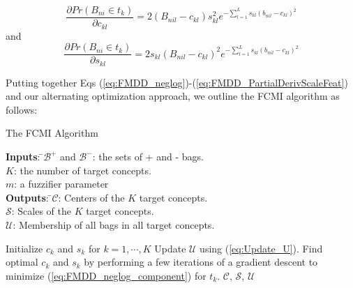 \documentclass[12pt,dvips]{report}
\numberwithin{equation}{section}
\begin{document}
\begin{equation}  \label{eq:FMDD_PartialDerivCentFeat}
\frac{\partial Pr(B_{ni}\!\!\in\!\!t_{k})}{\partial c_{kl}}=2(B_{nil}-c_{kl})s_{kl}^{2} e^{-\sum_{l=1}^{L}s_{kl}(b_{nil}-c_{kl})^{2}}
\end{equation}
and
\begin{equation} \label{eq:FMDD_PartialDerivScaleFeat}
\frac{\partial Pr(B_{ni}\!\!\in\!\!t_{k})}{\partial s_{kl}}=2s_{kl}(B_{nil}\!-\!c_{kl})^{2}e^{-\sum_{l=1}^{L}s_{kl}(b_{nil}-c_{kl})^{2}}
\end{equation}

Putting together Eqs (\ref{eq:FMDD_neglog})-(\ref{eq:FMDD_PartialDerivScaleFeat}) and our alternating optimization approach, we outline the FCMI algorithm as follows:

\begin{algorithm}
  \caption{The FCMI Algorithm}
  \label{alg:FCMI}
  {\begin{tabbing}
  \textbf{Inputs}: \=$\mathcal{B}^+$ and $\mathcal{B}^-$: the sets of + and - bags.\\
   \>$K$: the number of target concepts.\\
   \>$m$: a fuzzifier parameter\\
   \textbf{Outputs}: \=$\mathcal{C}$: Centers of the $K$ target concepts.\\
     \>$\mathcal{S}$: Scales of the $K$ target concepts.\\
   \>$\mathcal{U}$: Membership of all bags in all target concepts.\\
   \end{tabbing}}
  \begin{algorithmic}
    \STATE Initialize $c_k$ and $s_k$ for $k=1, \cdots, K$
    \REPEAT 
       \STATE Update $\mathcal{U}$ using (\ref{eq:Update_U}).
       \STATE Find optimal $c_{k}$  and $s_{k}$ by performing a few iterations of a gradient descent to minimize (\ref{eq:FMDD_neglog_component}) for $t_{k}$. \ENDFOR
    \RETURN $\mathcal{C}$, $\mathcal{S}$, $\mathcal{U}$
  \end{algorithmic}
\end{algorithm}
\end{document}
